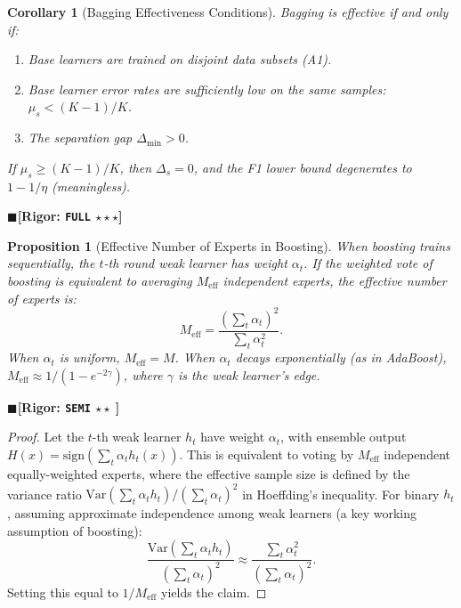 \documentclass[12pt,a4paper]{article}
\newtheorem{proposition}[theorem]{Proposition}
\newtheorem{corollary}[theorem]{Corollary}
\theoremstyle{definition}
\theoremstyle{remark}
\newcommand{\rigorFull}{$\blacksquare$\;\textbf{[Rigor: \texttt{FULL} $\star\star\star$]}}
\newcommand{\rigorSemi}{$\blacksquare$\;\textbf{[Rigor: \texttt{SEMI} $\star\star\;$]}}
\begin{document}
\begin{corollary}[Bagging Effectiveness Conditions]
\label{cor:1}
Bagging is effective if and only if:
\begin{enumerate}[label=\arabic*.]
\item Base learners are trained on disjoint data subsets (A1).
\item Base learner error rates are sufficiently low on the same samples: $\mu_s < (K-1)/K$.
\item The separation gap $\Delta_{\min} > 0$.
\end{enumerate}
If $\mu_s \geq (K-1)/K$, then $\Delta_s = 0$, and the F1 lower bound degenerates to $1 - 1/\eta$ (meaningless).
\end{corollary}
\rigorFull

\begin{proposition}[Effective Number of Experts in Boosting]
\label{prop:2}
When boosting trains sequentially, the $t$-th round weak learner has weight $\alpha_t$. If the weighted vote of boosting is equivalent to averaging $M_{\text{eff}}$ independent experts, the effective number of experts is:
\begin{equation}
M_{\text{eff}} = \frac{(\sum_t \alpha_t)^2}{\sum_t \alpha_t^2}.
\end{equation}
When $\alpha_t$ is uniform, $M_{\text{eff}} = M$. When $\alpha_t$ decays exponentially (as in AdaBoost), $M_{\text{eff}} \approx 1/(1-e^{-2\gamma})$, where $\gamma$ is the weak learner's edge.
\end{proposition}
\rigorSemi

\begin{proof}
Let the $t$-th weak learner $h_t$ have weight $\alpha_t$, with ensemble output $H(x) = \mathrm{sign}(\sum_t \alpha_t h_t(x))$. This is equivalent to voting by $M_{\text{eff}}$ independent equally-weighted experts, where the effective sample size is defined by the variance ratio $\mathrm{Var}(\sum_t \alpha_t h_t) / (\sum_t \alpha_t)^2$ in Hoeffding's inequality. For binary $h_t$, assuming approximate independence among weak learners (a key working assumption of boosting):
\begin{equation}
\frac{\mathrm{Var}(\sum_t \alpha_t h_t)}{(\sum_t \alpha_t)^2} \approx \frac{\sum_t \alpha_t^2}{(\sum_t \alpha_t)^2}.
\end{equation}
Setting this equal to $1/M_{\text{eff}}$ yields the claim.
\end{proof}
\end{document}
